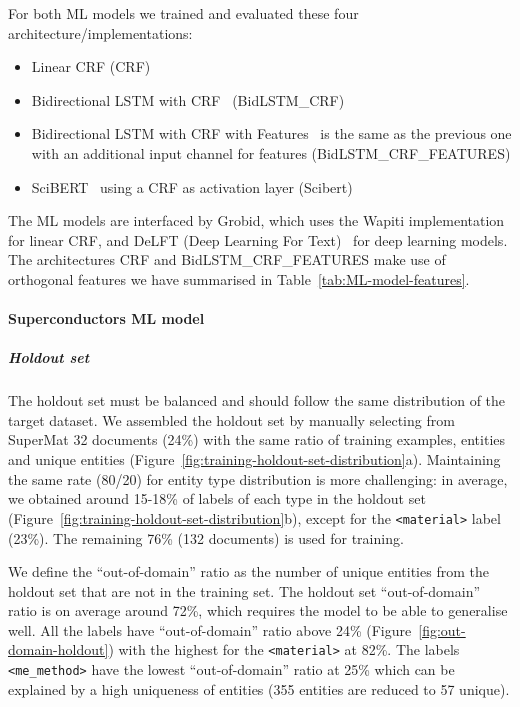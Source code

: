 \documentclass[]{interact}
\theoremstyle{plain}%
\theoremstyle{definition}
\theoremstyle{remark}
\begin{document}
For both ML models we trained and evaluated these four architecture/implementations: 
\begin{itemize}
    \item Linear CRF (CRF)
    \item Bidirectional LSTM with CRF~\cite{Lample2016NeuralAF} (BidLSTM\_CRF)
    \item Bidirectional LSTM with CRF with Features~\cite{Lample2016NeuralAF} is the same as the previous one with an additional input channel for features (BidLSTM\_CRF\_FEATURES)
    \item SciBERT~\cite{Beltagy2019SciBERT} using a CRF as activation layer (Scibert)
\end{itemize}

The ML models are interfaced by Grobid, which uses the Wapiti\cite{lavergne2010practical} implementation for linear CRF, and DeLFT (Deep Learning For Text)~\cite{DeLFT} for deep learning models.
The architectures CRF and BidLSTM\_CRF\_FEATURES make use of orthogonal features we have summarised in Table~\ref{tab:ML-model-features}. 

\paragraph*{Superconductors ML model}

\subparagraph*{Holdout set}
The holdout set must be balanced and should follow the same distribution of the target dataset. 
We assembled the holdout set by manually selecting from SuperMat 32 documents (24\%) with the same ratio of training examples, entities and unique entities (Figure~\ref{fig:training-holdout-set-distribution}a).
Maintaining the same rate (80/20) for entity type distribution is more challenging: in average, we obtained around 15-18\% of labels of each type in the holdout set (Figure~\ref{fig:training-holdout-set-distribution}b), except for the \texttt{<material>} label (23\%). %
The remaining 76\% (132 documents) is used for training. 

We define the ``out-of-domain'' ratio as the number of unique entities from the holdout set that are not in the training set. 
The holdout set ``out-of-domain'' ratio is on average around 72\%, which requires the model to be able to generalise well. 
All the labels have ``out-of-domain'' ratio above 24\%  (Figure~\ref{fig:out-domain-holdout}) with the highest for the \texttt{<material>} at 82\%. The labels \texttt{<me\_method>} have the lowest ``out-of-domain'' ratio at 25\% which can be explained by a high uniqueness of entities (355 entities are reduced to 57 unique). 
\end{document}
